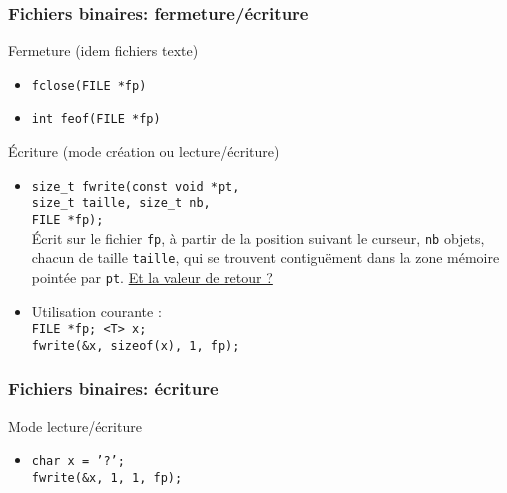 \documentclass[table,handout,tikz,12pt,svgnames]{beamer}
\begin{document}
\begin{frame}[fragile=singleslide]
	\frametitle{Fichiers binaires: fermeture/écriture}
	\begin{block}{Fermeture \footnotesize(idem fichiers texte)}
		\begin{itemize}
			\item \texttt{fclose(FILE *fp)}
			\item \texttt{int feof(FILE *fp)}
		\end{itemize}
	\end{block}
	\begin{block}{Écriture (mode création ou lecture/écriture)}
		\begin{itemize}
			\item \texttt{size\_t fwrite(const void *pt, \\ \hspace{7em} size\_t taille, size\_t nb, \\ \hspace{7em} FILE *fp);}\\
			Écrit sur le fichier \texttt{fp}, à partir de la position suivant le curseur, \texttt{nb} objets, chacun de taille \texttt{taille}, qui se trouvent contiguëment dans la zone mémoire pointée par \texttt{pt}. \underline{Et la valeur de retour ?}
			\item Utilisation courante :\\
			\texttt{FILE *fp; <T> x; \\fwrite(\&x, sizeof(x), 1, fp);}
		\end{itemize}
	\end{block}
\end{frame}


\begin{frame}[fragile=singleslide]
	\frametitle{Fichiers binaires: écriture}
	\begin{block}{Mode lecture/écriture}
		\begin{itemize}
			\vspace{2cm}
			\item \texttt{char x = '?';}\\
			\texttt{fwrite(\&x, 1, 1, fp);}
			\vspace{3cm}			
		\end{itemize}
	\end{block}
\end{frame}
\end{document}

